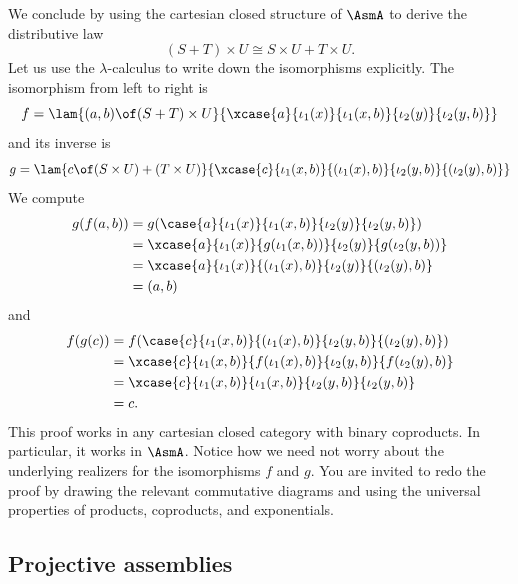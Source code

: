 We conclude by using the cartesian closed structure of $\AsmA$ to
derive the distributive law
%
\begin{equation*}
  (S + T) \times U \cong
  S \times U + T \times U.
\end{equation*}
%
Let us use the $\lambda$-calculus to write down the isomorphisms
explicitly. The isomorphism from left to right is
%
\begin{equation*}
  f = \lam{(a,b) \of (S + T) \times U}{
    \xcase{a}
    {\iota_1(x)}{\iota_1(x, b)}
    {\iota_2(y)}{\iota_2(y, b)}
  }
\end{equation*}
%
and its inverse is
%
\begin{equation*}
  g = \lam{c \of (S \times U) + (T \times U)}{
    \xcase{c}
    {\iota_1(x,b)}{(\iota_1(x), b)}
    {\iota_2(y,b)}{(\iota_2(y), b)}
  }
\end{equation*}
%
We compute
%
\begin{align*}
  g(f(a, b)) &=
  g(\case{a}
  {\iota_1(x)}{\iota_1(x, b)}
  {\iota_2(y)}{\iota_2(y, b)}) \\
  &=
  \xcase{a}
  {\iota_1(x)}{g(\iota_1(x, b))}
  {\iota_2(y)}{g(\iota_2(y, b))} \\
  &=
  \xcase{a}
  {\iota_1(x)}{(\iota_1(x), b)}
  {\iota_2(y)}{(\iota_2(y), b)} \\
  &=
  (a,b)
\end{align*}
%
and
\begin{align*}
  f(g(c)) &=
  f(
    \case{c}
    {\iota_1(x,b)}{(\iota_1(x), b)}
    {\iota_2(y,b)}{(\iota_2(y), b)}
  )
  \\
  &=
  \xcase{c}
  {\iota_1(x,b)}{f(\iota_1(x), b)}
  {\iota_2(y,b)}{f(\iota_2(y), b)}
  \\
  &=
  \xcase{c}
  {\iota_1(x,b)}{\iota_1(x, b)}
  {\iota_2(y,b)}{\iota_2(y, b)} \\
  &=
  c.
\end{align*}
%
This proof works in any cartesian closed category with binary
coproducts. In particular, it works in $\AsmA$. Notice how we need not
worry about the underlying realizers for the isomorphisms $f$ and $g$.
You are invited to redo the proof by drawing the relevant commutative
diagrams and using the universal properties of products, coproducts,
and exponentials.

\subsection{Projective assemblies}
\label{sec:projective-assemblies}

